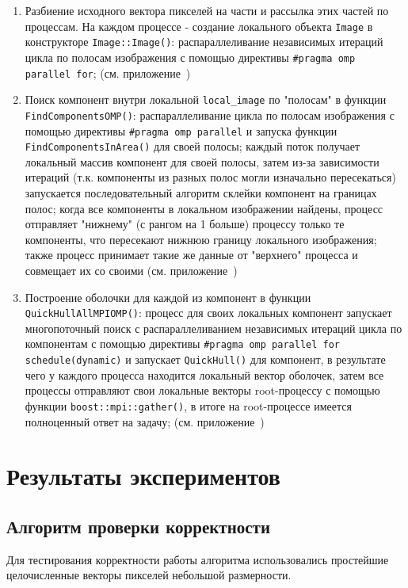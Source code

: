 \documentclass[12pt]{article}
\begin{document}
\begin{enumerate}
    \item Разбиение исходного вектора пикселей на части и рассылка этих частей по процессам. На каждом процессе - создание локального объекта \texttt{Image} в конструкторе \texttt{Image::Image()}: распараллеливание независимых итераций цикла по полосам изображения с помощью директивы \texttt{\#pragma omp parallel for}; (см. приложение~)
    \item Поиск компонент внутри локальной \texttt{local\_image} по "полосам" в функции \texttt{FindComponentsOMP()}: распараллеливание цикла по полосам изображения с помощью директивы \texttt{\#pragma omp parallel} и запуска функции \texttt{FindComponentsInArea()} для своей полосы; каждый поток получает локальный массив компонент для своей полосы, затем из-за зависимости итераций (т.к. компоненты из разных полос могли изначально пересекаться) запускается последовательный алгоритм склейки компонент на границах полос; когда все компоненты в локальном изображении найдены, процесс отправляет "нижнему" (с рангом на 1 больше) процессу только те компоненты, что пересекают нижнюю границу локального изображения; также процесс принимает такие же данные от "верхнего" процесса и совмещает их со своими (см. приложение~)
    \item Построение оболочки для каждой из компонент в функции \texttt{QuickHullAllMPIOMP()}: процесс для своих локальных компонент запускает многопоточный поиск с распараллеливанием независимых итераций цикла по компонентам с помощью директивы \texttt{\#pragma omp parallel for schedule(dynamic)} и запускает \texttt{QuickHull()} для компонент, в результате чего у каждого процесса находится локальный вектор оболочек, затем все процессы отправляют свои локальные векторы root-процессу с помощью функции \texttt{boost::mpi::gather()}, в итоге на root-процессе имеется полноценный ответ на задачу; (см. приложение~)
\end{enumerate}

\newpage

\section{Результаты экспериментов}
\subsection{Алгоритм проверки корректности}
Для тестирования корректности работы алгоритма использовались простейшие целочисленные векторы пикселей небольшой размерности. 
\end{document}
